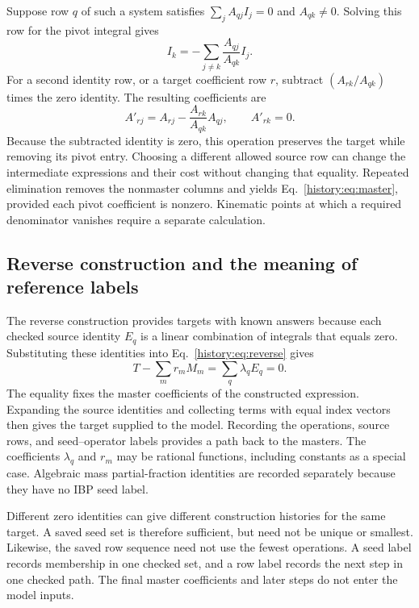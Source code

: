 Suppose row $q$ of such a system satisfies $\sum_jA_{qj}I_j=0$ and $A_{qk}\ne0$. Solving this row for the pivot integral gives
\begin{equation}
 I_k=-\sum_{j\ne k}\frac{A_{qj}}{A_{qk}}I_j.
 \label{history:eq:pivot}
\end{equation}
For a second identity row, or a target coefficient row $r$, subtract $(A_{rk}/A_{qk})$ times the zero identity. The resulting coefficients are
\begin{equation}
 A'_{rj}=A_{rj}-\frac{A_{rk}}{A_{qk}}A_{qj},
 \qquad A'_{rk}=0.
 \label{history:eq:row}
\end{equation}
Because the subtracted identity is zero, this operation preserves the target while removing its pivot entry. Choosing a different allowed source row can change the intermediate expressions and their cost without changing that equality. Repeated elimination removes the nonmaster columns and yields Eq.~\eqref{history:eq:master}, provided each pivot coefficient is nonzero. Kinematic points at which a required denominator vanishes require a separate calculation.

\subsection{Reverse construction and the meaning of reference labels}
\label{history:app:construction}
The reverse construction provides targets with known answers because each checked source identity $E_q$ is a linear combination of integrals that equals zero. Substituting these identities into Eq.~\eqref{history:eq:reverse} gives
\begin{equation}
 T-\sum_mr_mM_m=\sum_q\lambda_qE_q=0.
 \label{history:eq:reverse-check}
\end{equation}
The equality fixes the master coefficients of the constructed expression. Expanding the source identities and collecting terms with equal index vectors then gives the target supplied to the model. Recording the operations, source rows, and seed--operator labels provides a path back to the masters. The coefficients $\lambda_q$ and $r_m$ may be rational functions, including constants as a special case. Algebraic mass partial-fraction identities are recorded separately because they have no IBP seed label.

Different zero identities can give different construction histories for the same target. A saved seed set is therefore sufficient, but need not be unique or smallest. Likewise, the saved row sequence need not use the fewest operations. A seed label records membership in one checked set, and a row label records the next step in one checked path. The final master coefficients and later steps do not enter the model inputs.

